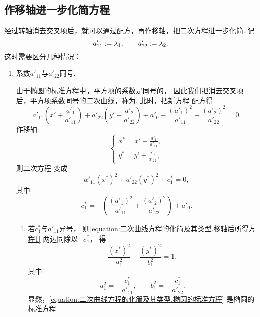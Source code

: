 \subsection{作移轴进一步化简方程}
经过转轴消去交叉项后，就可以通过配方，再作移轴，把二次方程进一步化简.
记\begin{equation*}
	a'_{11} := \lambda_1,
	\qquad
	a'_{22} := \lambda_2.
\end{equation*}
这时需要区分几种情况：
\begin{enumerate}
	\item 系数\(a'_{11}\)与\(a'_{22}\)同号.

	由于椭圆的标准方程中，平方项的系数是同号的，
	因此我们把消去交叉项后，平方项系数同号的二次曲线，称为.
	此时，把新方程  配方得\begin{equation*}
		a'_{11} \left( x' + \frac{a'_1}{a'_{11}} \right)
		+ a'_{22} \left( y' + \frac{a'_2}{a'_{22}} \right)
		+ a'_0
		- \frac{(a'_1)^2}{a'_{11}}
		- \frac{(a'_2)^2}{a'_{22}}
		= 0.
	\end{equation*}
	作移轴\begin{equation}\label{equation:二次曲线方程的化简及其类型.移轴变换}
		\left\{ \begin{array}{l}
			x^* = x' + \frac{a'_1}{a'_{11}}, \\
			y^* = y' + \frac{a'_2}{a'_{22}},
		\end{array} \right.
	\end{equation}
	则二次方程 
	变成\begin{equation}\label{equation:二次曲线方程的化简及其类型.移轴后所得方程1}
		a'_{11} (x^*)^2 + a'_{22} (y^*)^2 + c^*_1 = 0,
	\end{equation}
	其中\begin{equation*}
		c^*_1 = - \left( \frac{(a'_1)^2}{a'_{11}} + \frac{(a'_2)^2}{a'_{22}} \right) + a'_0.
	\end{equation*}
	\begin{enumerate}
		\item 若\(c^*_1\)与\(a'_{11}\)异号，
		则\cref{equation:二次曲线方程的化简及其类型.移轴后所得方程1} 两边同除以\(-c^*_1\)，
		得\begin{equation}\label{equation:二次曲线方程的化简及其类型.椭圆的标准方程}
			\frac{(x^*)^2}{a_1^2} + \frac{(y^*)^2}{b_1^2} = 1,
		\end{equation}
		其中\begin{equation*}
			a_1^2 = -\frac{c_1^*}{a'_{11}},
			\qquad
			b_1^2 = -\frac{c_1^*}{a'_{22}}.
		\end{equation*}
		显然，\cref{equation:二次曲线方程的化简及其类型.椭圆的标准方程} 是椭圆的标准方程.


\end{enumerate}
\end{enumerate}
